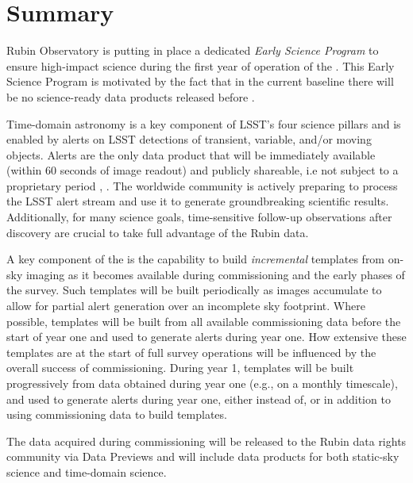 \section{Summary}

Rubin Observatory is putting in place a dedicated {\it Early Science Program} to ensure high-impact science during the first year of operation of the \lsst.
This Early Science Program is motivated by the fact that in the current baseline there will be no science-ready data products released before \drone. 

Time-domain astronomy is a key component of LSST's four science pillars and is enabled by alerts on LSST detections of transient, variable, and/or moving objects. 
Alerts are the only data product that will be immediately available (within 60 seconds of image readout) and publicly shareable, i.e not subject to a proprietary period \citep{LSE-163},  \citep{RDO-013}. 
The worldwide community is actively preparing to process the LSST alert stream and use it to generate groundbreaking scientific results. Additionally, for many science goals, time-sensitive follow-up observations after discovery are crucial to take full advantage of the Rubin data. 

A key component of the \esp is the capability to build {\it incremental} templates from on-sky imaging as it becomes available during commissioning and the early phases of the survey. 
Such templates will be built periodically as images accumulate to allow for partial alert generation over an incomplete sky footprint.
Where possible, templates will be built from all available commissioning data before the start of year one and used to generate alerts during year one.
How extensive these templates are at the start of full survey operations will be influenced by the overall success of commissioning.
During year 1, templates will be built progressively from data obtained during year one (e.g., on a monthly timescale), and used to generate alerts during year one, either instead of, or in addition to using commissioning data to build templates.

The data acquired during commissioning will be released to the Rubin data rights community via Data Previews and will include data products for both static-sky science and time-domain science.